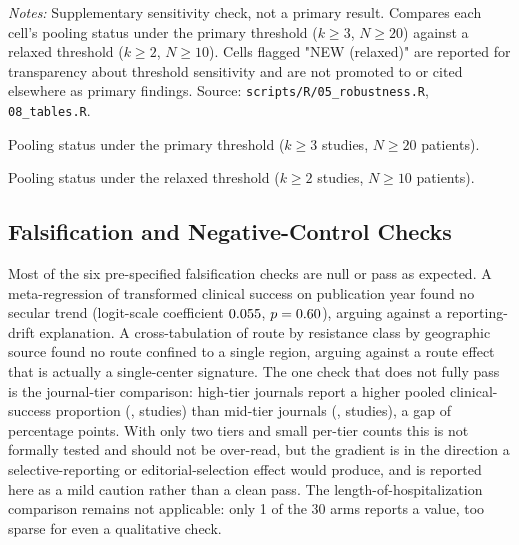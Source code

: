 \begin{table}[htbp]
\centering
\scriptsize
\setlength{\tabcolsep}{3pt}
\begin{threeparttable}
\caption{Appendix: effect of relaxing the pooling threshold to $k \geq 2$ studies and $N \geq 10$ patients}
\label{tab:threshold-relaxation}

\begin{tablenotes}
\small
\item \textit{Notes:} Supplementary sensitivity check, not a primary result. Compares each cell's pooling status under the primary threshold ($k \geq 3$, $N \geq 20$) against a relaxed threshold ($k \geq 2$, $N \geq 10$). Cells flagged "NEW (relaxed)" are reported for transparency about threshold sensitivity and are not promoted to  or cited elsewhere as primary findings. Source: \texttt{scripts/R/05\_robustness.R}, \texttt{08\_tables.R}.
\item[a] Pooling status under the primary threshold ($k \geq 3$ studies, $N \geq 20$ patients).
\item[b] Pooling status under the relaxed threshold ($k \geq 2$ studies, $N \geq 10$ patients).
\end{tablenotes}
\end{threeparttable}
\end{table}

\subsection{Falsification and Negative-Control Checks}
\label{sec:results-falsification}

Most of the six pre-specified falsification checks are null or pass as expected. A meta-regression of transformed clinical success on publication year found no secular trend (logit-scale coefficient $0.055$, $p=0.60$), arguing against a reporting-drift explanation. A cross-tabulation of route by resistance class by geographic source found no route confined to a single region, arguing against a route effect that is actually a single-center signature. The one check that does not fully pass is the journal-tier comparison: high-tier journals report a higher pooled clinical-success proportion (\JournalTierHighProp , \JournalTierHighK studies) than mid-tier journals (\JournalTierMidProp , \JournalTierMidK studies), a gap of \JournalTierGapPP percentage points. With only two tiers and small per-tier counts this is not formally tested and should not be over-read, but the gradient is in the direction a selective-reporting or editorial-selection effect would produce, and is reported here as a mild caution rather than a clean pass. The length-of-hospitalization comparison remains not applicable: only 1 of the 30 arms reports a value, too sparse for even a qualitative check.


